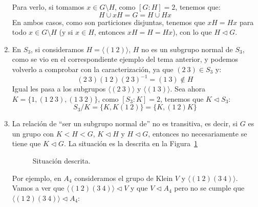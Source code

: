\begin{ejemplo}
\begin{enumerate}
            Para verlo, si tomamos $x\in G\setminus H$, como $[G:H] = 2$, tenemos que:
                \begin{equation*}
                    H\cup xH = G = H\cup Hx
                \end{equation*}
                En ambos casos, como son particiones disjuntas, tenemos que $xH = Hx$ para todo $x\in G\setminus H$ (y si $x\in H$, entonces $xH = H = Hx$), con lo que $H\lhd G$.
        \item En $S_3$, si consideramos $H = \langle (1\ 2) \rangle $, $H$ no es un subgrupo normal de $S_3$, como se vio en el correspondiente ejemplo del tema anterior, y podemos volverlo a comprobar con la caracterización, ya que $(2\ 3)\in S_3$ y:
            \begin{equation*}
                (2\ 3)(1\ 2){(2\ 3)}^{-1} = (1\ 3)\notin H
            \end{equation*}
            Igual les pasa a los subgrupos $\langle (2\ 3) \rangle $ y $\langle (1\ 3) \rangle $. Sea ahora $K = \{1, (1\ 2\ 3), (1\ 3\ 2)\}$, como $[S_3:K]=2$, tenemos que $K\lhd S_3$:
            \begin{equation*}
                S_3 / K = \{K, K(1\ 2)\} = \{K, (1\ 2)K\}
            \end{equation*}
        \item La relación de ``ser un subgrupo normal de'' no es transitiva, es decir, si $G$ es un grupo con $K<H<G$, $K\lhd H$ y $H\lhd G$, entonces no necesariamente se tiene que $K\lhd G$. La situación es la descrita en la Figura~\ref{fig:situacion}
            \begin{figure}[H]
                \centering
                \caption{Situación descrita.}
                \label{fig:situacion}
            \end{figure}

            Por ejemplo, en $A_4$ consideramos el grupo de Klein $V$ y $\langle (1\ 2)(3\ 4) \rangle $. Vamos a ver que $\langle (1\ 2)(3\ 4) \rangle \lhd V$ y que $V \lhd A_4 $ pero no se cumple que $\langle (1\ 2)(3\ 4) \rangle \lhd A_4 $:
            \begin{figure}[H]
                \centering
\end{figure}
\end{enumerate}
\end{ejemplo}
